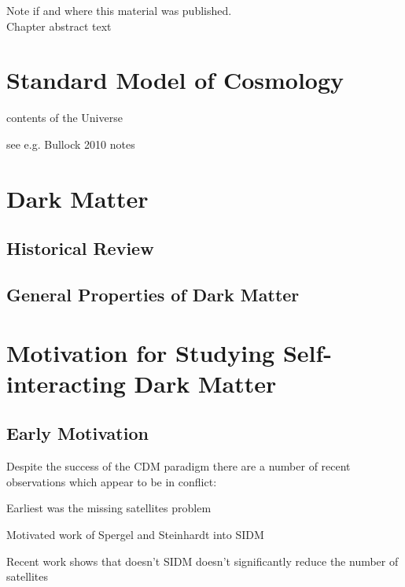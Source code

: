 \label{chapter:1}

\noindent Note if and where this material was published. \\

Chapter abstract text

\section{Standard Model of Cosmology}

contents of the Universe

see e.g. Bullock 2010 notes \citep{Bullock:2010uv}


\section{Dark Matter}

\subsection{Historical Review}

\subsection{General Properties of Dark Matter}

\section{Motivation for Studying Self-interacting Dark Matter}

\subsection{Early Motivation}

Despite the success of the CDM paradigm there are a number of recent observations which appear to be in conflict:

Earliest was the missing satellites problem \citep{Moore:1999ja} \citep{Klypin:1999ej}

	Motivated work of Spergel and Steinhardt into SIDM \citep{Spergel:2000cb}

	Recent work shows that doesn't SIDM doesn't significantly reduce the number of satellites

